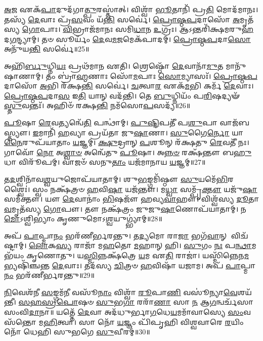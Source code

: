 \-\ul{𑌅}\-𑌜 𑌏𑌕᳴\-\ul{𑌪𑌾}\-𑌦𑍁𑌦᳴𑌗𑌾\-\ul{𑌤𑍍𑌪𑍁}\-𑌰𑌸𑍍𑌤𑌾॑𑌤𑍍।
𑌵𑌿𑌶𑍍𑌵𑌾᳴ \ul{𑌭𑍂}\-𑌤𑌾𑌨𑌿᳴ 𑌪𑍍𑌰\-\ul{𑌤𑌿} 𑌮𑍋𑌦᳴𑌮𑌾𑌨𑌃।
𑌤𑌸𑍍𑌯᳴ \ul{𑌦𑍇}\-𑌵𑌾𑌃 𑌪𑍍𑌰᳴\-\ul{𑌸}\-𑌵𑌂 𑌯᳴\-\ul{𑌨𑍍𑌤𑌿} 𑌸𑌰𑍍𑌵𑍇॑।
\-\ul{𑌪𑍍𑌰𑍋}\-\-\ul{𑌷𑍍𑌠}\-\-\ul{𑌪}\-𑌦𑌾𑌸𑍋᳴ \ul{𑌅}\-𑌮𑍃𑌤᳴𑌸𑍍𑌯 \ul{𑌗𑍋}\-𑌪𑌾𑌃।
\-\ul{𑌵𑌿}\-𑌭𑍍𑌰𑌾𑌜᳴𑌮𑌾𑌨𑌃 𑌸𑌮𑌿\-\ul{𑌧𑌾}\-𑌨 \ul{𑌉}\-𑌗𑍍𑌰𑌃।
𑌆𑌽𑌨𑍍𑌤𑌰𑌿᳴𑌕𑍍𑌷𑌮𑌰𑍁\-\ul{𑌹}\-𑌦\-\ul{𑌗}\-𑌨𑍍𑌦𑍍𑌯𑌾𑌮𑍍।
𑌤𑍞 𑌸𑍂𑌰𑍍𑌯𑌂᳴ \ul{𑌦𑍇}\-𑌵\-\ul{𑌮}\-𑌜𑌮𑍇𑌕᳴𑌪𑌾𑌦𑌮𑍍।
\-\ul{𑌪𑍍𑌰𑍋}\-\-\ul{𑌷𑍍𑌠}\-\-\ul{𑌪}\-𑌦𑌾\-\ul{𑌸𑍋} 𑌅𑌨𑍁᳴𑌯\-\ul{𑌨𑍍𑌤𑌿} 𑌸𑌰𑍍𑌵𑍇॑॥25॥ 

𑌅𑌹𑌿᳴\-\ul{𑌰𑍍𑌬𑍁}\-𑌧𑍍𑌨𑌿\-\ul{𑌯𑌃} 𑌪𑍍𑌰𑌥᳴𑌮𑌾𑌨 𑌏𑌤𑌿।
𑌶𑍍𑌰𑍇𑌷𑍍𑌠𑍋᳴ \ul{𑌦𑍇}\-𑌵𑌾𑌨𑌾᳴\-\ul{𑌮𑍁}\-𑌤 𑌮𑌾𑌨𑍁᳴𑌷𑌾𑌣𑌾𑌮𑍍।
𑌤𑌂 𑌬𑍍𑌰𑌾॑\-\ul{𑌹𑍍𑌮}\-𑌣𑌾𑌃 𑌸𑍋᳴\-\ul{𑌮}\-𑌪𑌾𑌃 \ul{𑌸𑍋}\-𑌮𑍍𑌯𑌾𑌸𑌃᳴।
\-\ul{𑌪𑍍𑌰𑍋}\-\-\ul{𑌷𑍍𑌠}\-\-\ul{𑌪}\-𑌦𑌾𑌸𑍋᳴ \ul{𑌅}\-𑌭𑌿 𑌰᳴𑌕𑍍𑌷\-\ul{𑌨𑍍𑌤𑌿} 𑌸𑌰𑍍𑌵𑍇॑।
\-\ul{𑌚}\-𑌤𑍍𑌵𑌾\-\ul{𑌰} 𑌏𑌕᳴\-\ul{𑌮}\-𑌭𑌿 𑌕𑌰𑍍𑌮᳴ \ul{𑌦𑍇}\-𑌵𑌾𑌃।
\-\ul{𑌪𑍍𑌰𑍋}\-\-\ul{𑌷𑍍𑌠}\-\-\ul{𑌪}\-𑌦𑌾\-\ul{𑌸} 𑌇\-\ul{𑌤𑌿} 𑌯𑌾𑌨𑍍 𑌵𑌦᳴𑌨𑍍𑌤𑌿।
𑌤𑍇 \ul{𑌬𑍁}\-𑌧𑍍𑌨𑌿𑌯𑌂᳴ 𑌪\-\ul{𑌰𑌿}\-𑌷𑌦𑍍𑌯𑍟᳴ \ul{𑌸𑍍𑌤𑍁}\-𑌵𑌨𑍍𑌤𑌃᳴।
𑌅𑌹𑌿𑍞᳴ 𑌰𑌕𑍍𑌷\-\ul{𑌨𑍍𑌤𑌿} 𑌨𑌮᳴𑌸𑍋\-\ul{𑌪}\-𑌸𑌦𑍍𑌯᳴॥26॥ 

\-\ul{𑌪𑍂}\-𑌷𑌾 \ul{𑌰𑍇}\-𑌵𑌤𑍍𑌯𑌨𑍍𑌵𑍇᳴\-\ul{𑌤𑌿} 𑌪𑌨𑍍𑌥𑌾॑𑌮𑍍।
\-\ul{𑌪𑍁}\-\-\ul{𑌷𑍍𑌟𑌿}\-𑌪𑌤𑍀᳴ 𑌪\-\ul{𑌶𑍁}\-𑌪𑌾 𑌵𑌾𑌜᳴𑌬𑌸𑍍𑌤𑍍𑌯𑍗।
\-\ul{𑌇}\-𑌮𑌾𑌨𑌿᳴ \ul{𑌹}\-𑌵𑍍𑌯𑌾 𑌪𑍍𑌰𑌯᳴𑌤𑌾 𑌜𑍁\-\ul{𑌷𑌾}\-𑌣𑌾।
\-\ul{𑌸𑍁}\-𑌗𑍈\-\ul{𑌰𑍍𑌨𑍋} 𑌯𑌾\-\ul{𑌨𑍈}\-𑌰𑍁𑌪᳴𑌯𑌾𑌤𑌾𑌂 \ul{𑌯}\-𑌜𑍍𑌞𑌮𑍍।
\-\ul{𑌕𑍍𑌷𑍁}\-𑌦𑍍𑌰𑌾𑌨𑍍 \ul{𑌪}\-𑌶𑍂𑌨𑍍 𑌰᳴𑌕𑍍𑌷𑌤𑍁 \ul{𑌰𑍇}\-𑌵𑌤𑍀᳴ 𑌨𑌃।
𑌗𑌾𑌵𑍋᳴ \ul{𑌨𑍋} 𑌅\-\ul{𑌶𑍍𑌵𑌾}\-\-\ul{𑍞} 𑌅𑌨𑍍𑌵𑍇᳴𑌤𑍁 \ul{𑌪𑍂}\-𑌷𑌾।
𑌅\-\ul{𑌨𑍍𑌨}\-\-\ul{𑍞} 𑌰𑌕𑍍𑌷᳴𑌨𑍍𑌤𑍗 𑌬\-\ul{𑌹𑍁}\-𑌧𑌾 𑌵𑌿𑌰𑍂᳴𑌪𑌮𑍍।
𑌵𑌾𑌜𑍞᳴ 𑌸𑌨𑍁\-\ul{𑌤𑌾𑌂} 𑌯𑌜᳴𑌮𑌾𑌨𑌾𑌯 \ul{𑌯}\-𑌜𑍍𑌞𑌮𑍍॥27॥ 

𑌤\-\ul{𑌦}\-𑌶𑍍𑌵𑌿𑌨𑌾᳴𑌵\-\ul{𑌶𑍍𑌵}\-𑌯𑍁𑌜𑍋𑌪᳴𑌯𑌾𑌤𑌾𑌮𑍍।
𑌶𑍁\-\ul{𑌭}\-𑌙𑍍𑌗𑌮𑌿᳴𑌷𑍍𑌠𑍗 \ul{𑌸𑍁}\-𑌯𑌮𑍇᳴\-\ul{𑌭𑌿}\-𑌰𑌶𑍍𑌵𑍈𑌃॑।
𑌸𑍍𑌵𑌂 𑌨𑌕𑍍𑌷᳴𑌤𑍍𑌰𑍞 \ul{𑌹}\-𑌵𑌿\-\ul{𑌷𑌾} 𑌯𑌜᳴𑌨𑍍𑌤𑍗।
𑌮\-\ul{𑌧𑍍𑌵𑌾} 𑌸𑌮𑍍𑌪𑍃᳴\-\ul{𑌕𑍍𑌤𑍗} 𑌯𑌜𑍁᳴\-\ul{𑌷𑌾} 𑌸𑌮᳴𑌕𑍍𑌤𑍗।
𑌯𑍗 \ul{𑌦𑍇}\-𑌵𑌾𑌨𑌾𑌂॑ \ul{𑌭𑌿}\-𑌷𑌜𑍗᳴ 𑌹𑌵𑍍𑌯\-\ul{𑌵𑌾}\-𑌹𑍗।
𑌵𑌿𑌶𑍍𑌵᳴𑌸𑍍𑌯 \ul{𑌦𑍂}\-𑌤𑌾\-\ul{𑌵}\-𑌮𑍃𑌤᳴𑌸𑍍𑌯 \ul{𑌗𑍋}\-𑌪𑍗।
𑌤𑍗 𑌨𑌕𑍍𑌷᳴𑌤𑍍𑌰𑌂 𑌜𑍁𑌜𑍁\-\ul{𑌷𑌾}\-𑌣𑍋𑌪᳴𑌯𑌾𑌤𑌾𑌮𑍍।
𑌨\-\ul{𑌮𑍋}\-𑌽𑌶𑍍𑌵𑌿𑌭𑍍𑌯𑌾𑌂॑ 𑌕𑍃𑌣𑍁𑌮𑍋𑌽\-\ul{𑌶𑍍𑌵}\-𑌯𑍁𑌗𑍍𑌭𑍍𑌯𑌾॑𑌮𑍍॥28॥ 

𑌅𑌪᳴ \ul{𑌪𑌾}\-𑌪𑍍𑌮𑌾\-\ul{𑌨𑌂} 𑌭𑌰᳴𑌣𑍀𑌰𑍍𑌭𑌰𑌨𑍍𑌤𑍁।
𑌤\-\ul{𑌦𑍍𑌯}\-𑌮𑍋 𑌰𑌾\-\ul{𑌜𑌾} 𑌭𑌗᳴\-\ul{𑌵𑌾}\-𑌨𑍍 𑌵𑌿𑌚᳴𑌷𑍍𑌟𑌾𑌮𑍍।
\-\ul{𑌲𑍋}\-𑌕\-\ul{𑌸𑍍𑌯} 𑌰𑌾𑌜𑌾᳴ 𑌮\-\ul{𑌹}\-𑌤𑍋 \ul{𑌮}\-𑌹𑌾𑌨𑍍 𑌹𑌿।
\-\ul{𑌸𑍁}\-𑌗𑌂 \ul{𑌨𑌃} 𑌪\-\ul{𑌨𑍍𑌥𑌾}\-𑌮𑌭᳴𑌯𑌂 𑌕𑍃𑌣𑍋𑌤𑍁।
𑌯\-\ul{𑌸𑍍𑌮𑌿}\-𑌨𑍍𑌨𑌕𑍍𑌷᳴𑌤𑍍𑌰𑍇 \ul{𑌯}\-𑌮 𑌏\-\ul{𑌤𑌿} 𑌰𑌾𑌜𑌾॑।
𑌯𑌸𑍍𑌮𑌿᳴𑌨𑍍𑌨𑍇𑌨\-\ul{𑌮}\-𑌭𑍍𑌯𑌷𑌿᳴𑌞𑍍𑌚𑌨𑍍𑌤 \ul{𑌦𑍇}\-𑌵𑌾𑌃।
𑌤𑌦᳴𑌸𑍍𑌯 \ul{𑌚𑌿}\-𑌤𑍍𑌰𑍞 \ul{𑌹}\-𑌵𑌿𑌷𑌾᳴ 𑌯𑌜𑌾𑌮।
𑌅𑌪᳴ \ul{𑌪𑌾}\-𑌪𑍍𑌮𑌾\-\ul{𑌨𑌂} 𑌭𑌰᳴𑌣𑍀𑌰𑍍𑌭𑌰𑌨𑍍𑌤𑍁॥29॥ 

\-\ul{𑌨𑌿}\-𑌵𑍇𑌶᳴𑌨𑍀 \ul{𑌸}\-𑌙𑍍𑌗𑌮᳴\-\ul{𑌨𑍀} 𑌵𑌸𑍂᳴\-\ul{𑌨𑌾𑌂} 𑌵𑌿𑌶𑍍𑌵𑌾᳴ \ul{𑌰𑍂}\-𑌪𑌾\-\ul{𑌣𑌿} 𑌵𑌸𑍂॑𑌨𑍍𑌯𑌾\-\ul{𑌵𑍇}\-𑌶𑌯᳴𑌨𑍍𑌤𑍀।
\-\ul{𑌸}\-\-\ul{𑌹}\-\-\ul{𑌸𑍍𑌰}\-\-\ul{𑌪𑍋}\-𑌷𑍞 \ul{𑌸𑍁}\-𑌭\-\ul{𑌗𑌾} 𑌰𑌰𑌾᳴\-\ul{𑌣𑌾} 𑌸𑌾 \ul{𑌨} 𑌆\-\ul{𑌗}\-𑌨𑍍𑌵𑌰𑍍𑌚᳴𑌸𑌾 𑌸𑌂𑌵𑌿\-\ul{𑌦𑌾}\-𑌨𑌾॥ 𑌯𑌤𑍍𑌤𑍇᳴ \ul{𑌦𑍇}\-𑌵𑌾 𑌅𑌦᳴𑌧𑍁𑌰𑍍𑌭𑌾\-\ul{𑌗}\-𑌧𑍇\-\ul{𑌯}\-𑌮𑌮𑌾᳴𑌵𑌾𑌸𑍍𑌯𑍇 \ul{𑌸𑌂}\-𑌵𑌸᳴𑌨𑍍𑌤𑍋 𑌮\-\ul{𑌹𑌿}\-𑌤𑍍𑌵𑌾।
𑌸𑌾 𑌨𑍋᳴ \ul{𑌯}\-𑌜𑍍𑌞𑌂 𑌪𑌿᳴𑌪𑍃𑌹𑌿 𑌵𑌿𑌶𑍍𑌵𑌵𑌾𑌰𑍇 \ul{𑌰}\-𑌯𑌿𑌂 𑌨𑍋᳴ 𑌧𑍇𑌹𑌿 𑌸𑍁𑌭𑌗𑍇 \ul{𑌸𑍁}\-𑌵𑍀𑌰𑌮𑍍॑॥30॥ 
